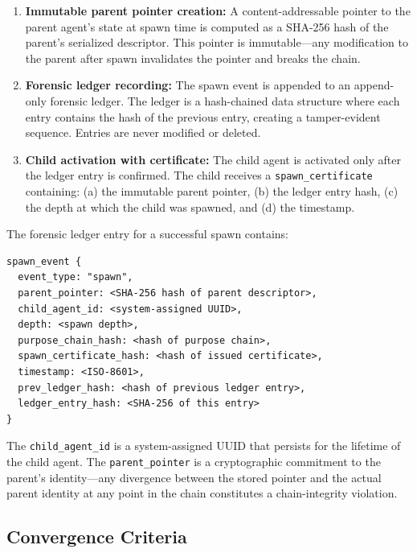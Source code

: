 \begin{enumerate}
\item \textbf{Immutable parent pointer creation:} A content-addressable pointer to the parent agent's state at spawn time is computed as a SHA-256 hash of the parent's serialized descriptor. This pointer is immutable—any modification to the parent after spawn invalidates the pointer and breaks the chain.
\item \textbf{Forensic ledger recording:} The spawn event is appended to an append-only forensic ledger. The ledger is a hash-chained data structure where each entry contains the hash of the previous entry, creating a tamper-evident sequence. Entries are never modified or deleted.
\item \textbf{Child activation with certificate:} The child agent is activated only after the ledger entry is confirmed. The child receives a \texttt{spawn\_certificate} containing: (a) the immutable parent pointer, (b) the ledger entry hash, (c) the depth at which the child was spawned, and (d) the timestamp.
\end{enumerate}

The forensic ledger entry for a successful spawn contains:

\begin{verbatim}
spawn_event {
  event_type: "spawn",
  parent_pointer: <SHA-256 hash of parent descriptor>,
  child_agent_id: <system-assigned UUID>,
  depth: <spawn depth>,
  purpose_chain_hash: <hash of purpose chain>,
  spawn_certificate_hash: <hash of issued certificate>,
  timestamp: <ISO-8601>,
  prev_ledger_hash: <hash of previous ledger entry>,
  ledger_entry_hash: <SHA-256 of this entry>
}
\end{verbatim}

The \texttt{child\_agent\_id} is a system-assigned UUID that persists for the lifetime of the child agent. The \texttt{parent\_pointer} is a cryptographic commitment to the parent's identity—any divergence between the stored pointer and the actual parent identity at any point in the chain constitutes a chain-integrity violation.

\subsection{Convergence Criteria}

\label{sec:convergence}

